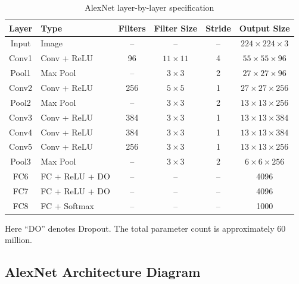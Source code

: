 \documentclass[12pt,a4paper]{article}
\begin{document}
\begin{table}[ht]
\centering
\caption{AlexNet layer-by-layer specification}
\label{tab:alexnet_layers}
\begin{tabular}{@{}clcccc@{}}
\toprule
Layer & Type & Filters & Filter Size & Stride & Output Size \\
\midrule
Input  & Image          & --  & --            & -- & $224\times224\times3$ \\
Conv1  & Conv + ReLU    & 96  & $11\times11$  & 4  & $55\times55\times96$ \\
Pool1  & Max Pool       & --  & $3\times3$    & 2  & $27\times27\times96$ \\
Conv2  & Conv + ReLU    & 256 & $5\times5$    & 1  & $27\times27\times256$ \\
Pool2  & Max Pool       & --  & $3\times3$    & 2  & $13\times13\times256$ \\
Conv3  & Conv + ReLU    & 384 & $3\times3$    & 1  & $13\times13\times384$ \\
Conv4  & Conv + ReLU    & 384 & $3\times3$    & 1  & $13\times13\times384$ \\
Conv5  & Conv + ReLU    & 256 & $3\times3$    & 1  & $13\times13\times256$ \\
Pool3  & Max Pool       & --  & $3\times3$    & 2  & $6\times6\times256$ \\
FC6    & FC + ReLU + DO & -- & --             & -- & 4096 \\
FC7    & FC + ReLU + DO & -- & --             & -- & 4096 \\
FC8    & FC + Softmax   & -- & --             & -- & 1000 \\
\bottomrule
\end{tabular}
\end{table}

\noindent Here ``DO'' denotes Dropout. The total parameter count is approximately $60$ million.

\subsection{AlexNet Architecture Diagram}
\end{document}

